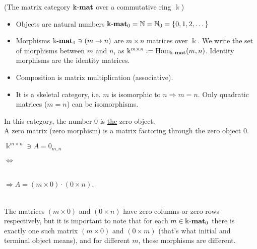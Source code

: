 \begin{example}{(The matrix category $\Bbbk\textnormal{-}\mathbf{mat}$ over a commutative ring $\Bbbk$)}\label{ex:matrix_category}
\begin{itemize}
\item Objects are natural numbers $\Bbbk\textnormal{-}\mathbf{mat}_{0} = \mathbb{N} = \mathbb{N}_{0} = \{0,1,2,\dots\}$
\item Morphisms $\Bbbk\textnormal{-}\mathbf{mat}_{1} \ni (m \rightarrow n)$ are $m \times n$ matrices over $\Bbbk$.
We write the set of morphisms between $m$ and $n$, as $\Bbbk^{m\times n} := \textup{Hom}_{\Bbbk\textnormal{-}\mathbf{mat}}(m,n)$. Identity morphisms are the
identity matrices.
\item Composition is matrix multiplication (associative).
\item It is a skeletal category, i.e. $m$ is isomorphic to $n \Rightarrow m = n$. Only quadratic matrices ($m = n$) can be
isomorphisms.
\end{itemize}
In this category, the number $0$ is \ul{the} zero object.\\
A zero matrix (zero morphism) is a matrix factoring through the zero object $0$.\\
\begin{minipage}{.2\textwidth}\phantom{ }\end{minipage}
\begin{minipage}{.25\textwidth}
$\Bbbk^{m\times n} \ni A = 0_{m,n}$
\end{minipage}
\begin{minipage}{.08\textwidth}
$\Longleftrightarrow$
\end{minipage}
\begin{minipage}{.32\textwidth}
\\
$\Rightarrow A = (m \times 0) \cdot (0 \times n)$.
\end{minipage}
\begin{minipage}{.15\textwidth}\phantom{ }\end{minipage}\\

\noindent The matrices $(m \times 0)$ and $(0 \times n)$ have zero columns or zero rows respectively, but it is
important to note that for each $m \in \Bbbk\textnormal{-}\mathbf{mat}_{0}$ there is exactly one such matrix $(m \times 0)$ and $(0 \times m)$
(that's what initial and terminal object means), and for different $m$, these morphisms are different.
\end{example}

